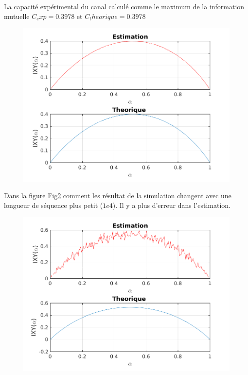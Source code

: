 \documentclass{report}
\begin{document}
La capacité expérimental du canal calculé comme le maximum de la information mutuelle $C_exp=0.3978$ et $C_theorique=0.3978$\\
\begin{figure}[h]
	\centering
	\captionsetup{justification=centering}
	\includegraphics[width=0.6\linewidth]{../canal3}
	\caption{}
	\label{fig:}
\end{figure}
Dans la figure Fig\ref{fig:comparaison} comment les résultat de la simulation changent avec une longueur de séquence plus petit ($1e4$). Il y a plus d'erreur dans l'estimation.
\begin{figure}[h]
	\centering
	\captionsetup{justification=centering}
	\includegraphics[width=0.7\linewidth]{../canal23}
	\caption{}
	\label{fig:comparaison}
\end{figure}

\end{document}
